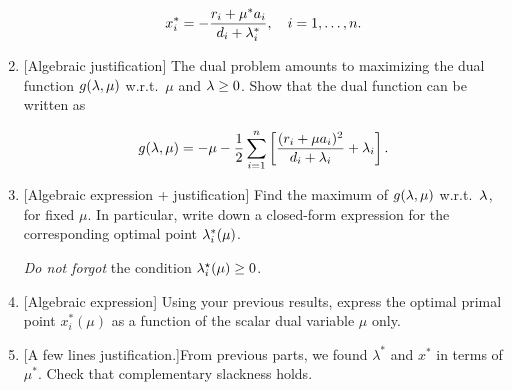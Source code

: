 \begin{enumerate}
\[
x_i^* = -\frac{r_i + \mu^* a_i}{d_i+\lambda^*_i}, \quad i=1,\ldots,n.
\]

\sol{

}

\item {[Algebraic justification]} The dual problem amounts to maximizing the dual function $g(\lambda,\mu)$ w.r.t.\ $\mu$ and $\lambda\geq 0$. Show that the dual function can be written as

\[
g(\lambda, \mu) = -\mu -\frac{1}{2} \sum_{i=1}^n \left[\frac{(r_i+\mu a_i)^2}{d_i+\lambda_i} + \lambda_i\right].
\]

\sol{

}

\item  {[Algebraic expression + justification]} Find the maximum of $g(\lambda,\mu)$ w.r.t.\ $\lambda$, for fixed $\mu$. In particular, write down a closed-form expression for the corresponding optimal point $\lambda_i^*(\mu)$.

\textit{Do not forgot} the condition $\lambda_i^\star(\mu) \geq 0$.

\sol{

}

\item {[Algebraic expression]} Using your previous results, express the optimal primal point $x_i^*(\mu)$ as a function of the scalar dual variable $\mu$ only.

\sol{

}

\item {[A few lines justification.]}From previous parts, we found $\lambda^*$ and $x^*$ in terms of $\mu^*$. Check that complementary slackness holds. 

\sol{

}
\end{enumerate}



